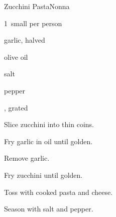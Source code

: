 \begin{recipe}{Zucchini Pasta}{Nonna}{}

\begin{ingredients}
\item 1~small  per person
\item garlic, halved
\item olive oil
\item salt
\item pepper
\item {}, grated
\end{ingredients}

\begin{directions}
\item Slice zucchini into thin coins.
\item Fry garlic in oil until golden.
\item Remove garlic.
\item Fry zucchini until golden.
\item Toss with cooked pasta and cheese.
\item Season with salt and pepper.
\end{directions}

\end{recipe}

